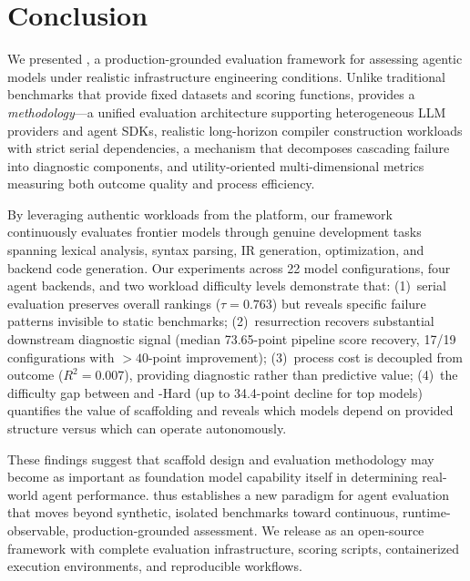 \section{Conclusion}

We presented \eva{}, a production-grounded evaluation framework for assessing agentic models under realistic infrastructure engineering conditions.
Unlike traditional benchmarks that provide fixed datasets and scoring functions, \eva{} provides a \emph{methodology}---a unified evaluation architecture supporting heterogeneous LLM providers and agent SDKs, realistic long-horizon compiler construction workloads with strict serial dependencies, a \resurrection{} mechanism that decomposes cascading failure into diagnostic components, and utility-oriented multi-dimensional metrics measuring both outcome quality and process efficiency.

By leveraging authentic workloads from the \yatcc{} platform, our framework continuously evaluates frontier models through genuine development tasks spanning lexical analysis, syntax parsing, IR generation, optimization, and backend code generation.
Our experiments across 22 model configurations, four agent backends, and two workload difficulty levels demonstrate that:
(1)~serial evaluation preserves overall rankings ($\tau = 0.763$) but reveals specific failure patterns invisible to static benchmarks;
(2)~resurrection recovers substantial downstream diagnostic signal (median 73.65-point pipeline score recovery, 17/19 configurations with $>40$-point improvement);
(3)~process cost is decoupled from outcome ($R^2 = 0.007$), providing diagnostic rather than predictive value;
(4)~the difficulty gap between \yatcc{} and \yatcc{}-Hard (up to 34.4-point decline for top models) quantifies the value of scaffolding and reveals which models depend on provided structure versus which can operate autonomously.

These findings suggest that scaffold design and evaluation methodology may become as important as foundation model capability itself in determining real-world agent performance.
\eva{} thus establishes a new paradigm for agent evaluation that moves beyond synthetic, isolated benchmarks toward continuous, runtime-observable, production-grounded assessment.
We release \eva{} as an open-source framework with complete evaluation infrastructure, scoring scripts, containerized execution environments, and reproducible workflows.